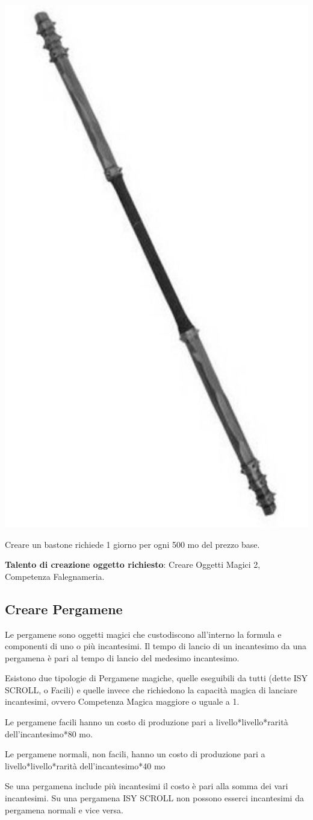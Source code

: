 \begin{multicols}{2}
\begin{center}
\includegraphics[width=0.35\linewidth]{immagini/staff2.png}
\end{center}

Creare un bastone richiede 1 giorno per ogni 500 mo del prezzo base.

\medskip

\textbf{Talento di creazione oggetto richiesto}: Creare Oggetti Magici 2, Competenza Falegnameria.

\subsection{Creare Pergamene}
\label{crearepergamene}\hypertarget{crearepergamene}{}

Le pergamene sono oggetti magici che custodiscono all'interno la formula e componenti di uno o più incantesimi. Il tempo di lancio di un incantesimo da una pergamena è pari al tempo di lancio del medesimo incantesimo.

Esistono due tipologie di Pergamene magiche, quelle eseguibili da tutti (dette ISY SCROLL, o Facili) e quelle invece che richiedono la capacità magica di lanciare incantesimi, ovvero Competenza Magica maggiore o uguale a 1.

Le pergamene facili hanno un costo di produzione pari a livello*livello*rarità dell'incantesimo*80 mo.

Le pergamene normali, non facili, hanno un costo di produzione pari a livello*livello*rarità dell'incantesimo*40 mo

Se una pergamena include più incantesimi il costo è pari alla somma dei vari incantesimi. Su una pergamena ISY SCROLL non possono esserci incantesimi da pergamena normali e vice versa.


\end{multicols}
